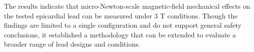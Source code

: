 The results indicate that micro-Newton-scale magnetic-field mechanical effects on the tested epicardial lead can be measured under 3 T conditions. Though the findings are limited to a single configuration and do not support general safety conclusions, it established a methodology that can be extended to evaluate a broader range of lead designs and conditions.


